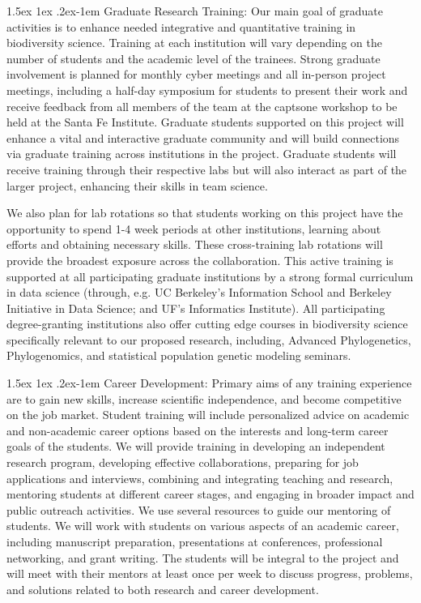 \documentclass[11pt]{article}
\makeatletter
\renewcommand{\paragraph}{\@startsection{paragraph}{4}{\z@}
  {1.5ex \@plus 1ex \@minus .2ex}{-1em}
  {\normalfont\normalsize\it}
}
\makeatother
\begin{document}
\paragraph{Graduate Research Training:} Our main goal of graduate
activities is to enhance needed integrative and quantitative training
in biodiversity science.  Training at each institution will vary
depending on the number of students and the academic level of
the trainees. Strong graduate involvement is planned
for monthly cyber meetings and all in-person project meetings,
including a half-day symposium for students to present their work and
receive feedback from all members of the team at the captsone workshop
to be held at the Santa Fe Institute. Graduate students supported on
this project will enhance a vital and interactive graduate community
and will build connections via graduate training across institutions
in the project. Graduate students will receive training
through their respective labs but will also interact as part of the
larger project, enhancing their skills in team science.

We also plan for lab rotations so that students working
on this project have the opportunity to spend 1-4 week periods at
other institutions, learning about efforts and obtaining necessary
skills.  These cross-training lab rotations will provide the broadest
exposure across the collaboration.  This active training is supported
at all participating graduate institutions by a strong formal
curriculum in data science (through, e.g. UC Berkeley's Information
School and Berkeley Initiative in Data Science; and UF's Informatics
Institute). All participating degree-granting institutions also offer
cutting edge courses in biodiversity science specifically relevant to
our proposed research, including, Advanced Phylogenetics,
Phylogenomics, and statistical population genetic modeling seminars.

\paragraph{Career Development:} Primary aims of any training
experience are to gain new skills, increase scientific independence,
and become competitive on the job market. Student training will
include personalized advice on academic and non-academic career
options based on the interests and long-term career goals of the
students. We will provide training in developing an independent
research program, developing effective collaborations, preparing for
job applications and interviews, combining and integrating teaching
and research, mentoring students at different career stages, and
engaging in broader impact and public outreach activities. We use
several resources to guide our mentoring of students. We will work
with students on various aspects of an academic career, including
manuscript preparation, presentations at conferences, professional
networking, and grant writing. The students will be integral to the
project and will meet with their mentors at least once per week to
discuss progress, problems, and solutions related to both research and
career development.
\end{document}
